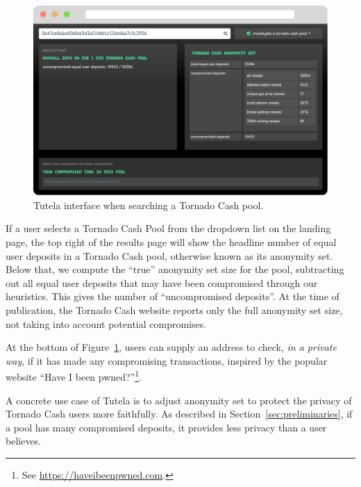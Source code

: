 \begin{figure}[h!]
\includegraphics[width=\linewidth]{figures/demo2.pdf}
\caption{Tutela interface when searching a Tornado Cash pool.}
\label{fig:demo2}
\end{figure}

If a user selects a Tornado Cash Pool from the dropdown list on the landing page, the top right of the results page will show the headline number of equal user deposits in a Tornado Cash pool, otherwise known as its anonymity set. Below that, we compute the ``true'' anonymity set size for the pool, subtracting out all equal user deposits that may have been compromised through our heuristics. This gives the number of “uncompromised deposits”. At the time of publication, the Tornado Cash website reports only the full anonymity set size, not taking into account potential compromises. 

At the bottom of Figure~\ref{fig:demo2}, users can supply an address to check, \textit{in a private way}, if it has made any compromising transactions, inspired by the popular website ``Have I been pwned?''\footnote{See \url{https://haveibeenpwned.com}.}.

A concrete use case of Tutela is to adjust anonymity set to protect the privacy of Tornado Cash users more faithfully. As described in Section~\ref{sec:preliminaries}, if a pool has many compromised deposits, it provides less privacy than a user believes.